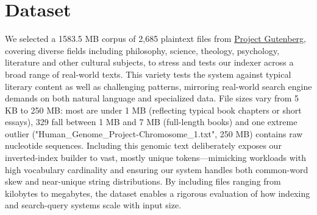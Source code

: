 \section{Dataset}

\hypersetup{
	colorlinks=true,
	urlcolor=blue
}

We selected a 1583.5 MB corpus of 2,685 plaintext files from \href{https://www.gutenberg.org/}{Project Gutenberg}, covering diverse fields including philosophy, science, theology, psychology, literature and other cultural subjects, to stress and tests our indexer across a broad range of real-world texts. This variety tests the system against typical literary content as well as challenging patterns, mirroring real-world search engine demands on both natural language and specialized data. File sizes vary from 5 KB to 250 MB: most are under 1 MB (reflecting typical book chapters or short essays), 329 fall between 1 MB and 7 MB (full-length books) and one extreme outlier ("Human\_Genome\_Project-Chromosome\_1.txt", 250 MB) contains raw nucleotide sequences. Including this genomic text deliberately exposes our inverted-index builder to vast, mostly unique tokens—mimicking workloads with high vocabulary cardinality and ensuring our system handles both common-word skew and near-unique string distributions. By including files ranging from kilobytes to megabytes, the dataset enables a rigorous evaluation of how indexing and search-query systems scale with input size. 


